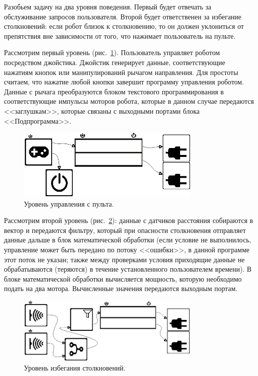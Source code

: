\documentclass[conference]{IEEEtran}
\begin{document}
Разобьем задачу на два уровня поведения. Первый будет отвечать за обслуживание запросов пользователя. Второй будет ответственен за избегание столкновений: если робот близок к столкновению, то он должен уклониться от препятствия вне зависимости от того, что нажимает пользователь на пульте. 

Рассмотрим первый уровень (рис.~\ref{image:layer1}). Пользователь управляет роботом посредством джойстика. Джойстик генерирует данные, соответствующие нажатиям кнопок или манипулирований рычагом направления. Для простоты считаем, что нажатие любой кнопки завершит программу управления роботом. Данные с рычага преобразуются блоком текстового программирования в соответствующие импульсы моторов робота, которые в данном случае передаются <<заглушкам>>, которые связаны с выходными портами блока <<Подпрограмма>>. 
\begin{figure}[ht]
	\centering
	\includegraphics[width=3.5in]{pultLayer.png}
	\caption{Уровень управления с пульта.}
	\label{image:layer1}
\end{figure}

Рассмотрим второй уровень (рис.~\ref{image:layer2}): данные с датчиков расстояния собираются в вектор и передаются фильтру, который при опасности столкновения отправляет данные дальше в блок математической обработки (если условие не выполнилось, управление может быть передано по потоку <<ошибки>>, в данной программе этот поток не указан; также между проверками условия приходящие данные не обрабатываются (теряются) в течение установленного пользователем времени). В блоке математической обработки вычисляется мощность, которую необходимо подать на два мотора. Вычисленные значения передаются выходным портам.
\begin{figure}[ht]
	\centering
	\includegraphics[width=3.5in]{collisionLayer.png}
	\caption{Уровень избегания столкновений.}
	\label{image:layer2}
\end{figure}
\end{document}
